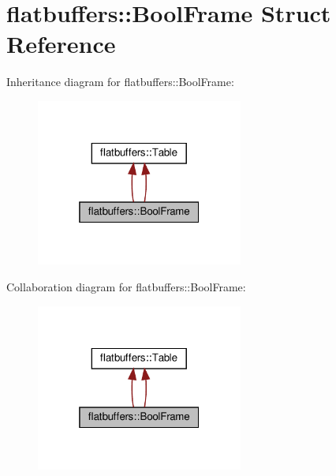 \hypertarget{structflatbuffers_1_1BoolFrame}{}\section{flatbuffers\+:\+:Bool\+Frame Struct Reference}
\label{structflatbuffers_1_1BoolFrame}


Inheritance diagram for flatbuffers\+:\+:Bool\+Frame\+:
\nopagebreak
\begin{figure}[H]
\begin{center}
\leavevmode
\includegraphics[width=193pt]{structflatbuffers_1_1BoolFrame__inherit__graph}
\end{center}
\end{figure}


Collaboration diagram for flatbuffers\+:\+:Bool\+Frame\+:
\nopagebreak
\begin{figure}[H]
\begin{center}
\leavevmode
\includegraphics[width=193pt]{structflatbuffers_1_1BoolFrame__coll__graph}
\end{center}
\end{figure}
